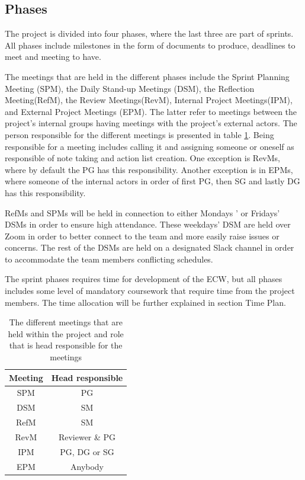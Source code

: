 \documentclass{article}
\begin{document}
\subsection{Phases}
The project is divided into four phases, where the last three are part of sprints. All phases include milestones in the form of documents to produce, deadlines to meet and meeting to have.

The meetings that are held in the different phases include the Sprint Planning Meeting (SPM), the Daily Stand-up Meetings (DSM), the Reflection Meeting(RefM), the Review Meetings(RevM), Internal Project Meetings(IPM), and External Project Meetings (EPM). The latter refer to meetings between the project's internal groups having meetings with the project's external actors. The person responsible for the different meetings is presented in table \ref{tab:meetings}. Being responsible for a meeting includes calling it and assigning someone or oneself as responsible of  note taking and action list creation. One exception is RevMs, where by default the PG has this responsibility. Another exception is in EPMs, where someone of the internal actors in order of first PG, then SG and lastly DG has this responsibility.

RefMs and SPMs will be held in connection to either Mondays
' or Fridays' DSMs in order to ensure high attendance. These weekdays' DSM are held over Zoom in order to better connect to the team and more easily raise issues or concerns. The rest of the DSMs are  held on a designated Slack channel in order to accommodate the team members conflicting schedules. 

The sprint phases requires time for development of the ECW, but all phases includes some level of mandatory coursework that require time from the project members. The time allocation will be further explained in section Time Plan. 

\begin{table}[H]
    \centering
    \begin{tabular}{|c|c|}
    \hline
        Meeting & Head responsible \\
        \hline \hline
        SPM & PG \\
        \hline
        DSM & SM \\
        \hline
        RefM & SM \\
        \hline
        RevM & Reviewer \& PG \\
        \hline
        IPM & PG, DG or SG  \\
        \hline
        EPM & Anybody \\
        \hline
    \end{tabular}
    \caption{The different meetings that are held within the project and role that is head responsible for the meetings}
    \label{tab:meetings}
\end{table}
\end{document}
